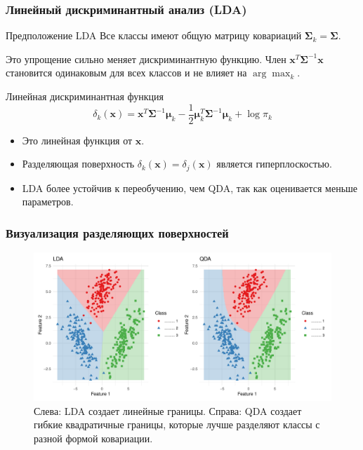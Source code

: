 \documentclass[notheorems, handout]{beamer}
\newcommand{\vect}[1]{\mathbf{#1}}
\newcommand{\matr}[1]{\boldsymbol{#1}}
\begin{document}
\begin{frame}
  \frametitle{Линейный дискриминантный анализ (LDA)}
  \begin{block}{Предположение LDA}
    Все классы имеют общую матрицу ковариаций $\matr{\Sigma}_k = \matr{\Sigma}$.
  \end{block}
  
  Это упрощение сильно меняет дискриминантную функцию. Член $\vect{x}^T\matr{\Sigma}^{-1}\vect{x}$ становится одинаковым для всех классов и не влияет на $\arg\max_k$.
  
  \begin{block}{Линейная дискриминантная функция}
    $$ \delta_k(\vect{x}) = \vect{x}^T\matr{\Sigma}^{-1}\matr{\mu}_k - \frac{1}{2}\matr{\mu}_k^T\matr{\Sigma}^{-1}\matr{\mu}_k + \log\pi_k $$
  \end{block}
  \begin{itemize}
    \item Это линейная функция от $\vect{x}$.
    \item Разделяющая поверхность $\delta_k(\vect{x}) = \delta_j(\vect{x})$ является гиперплоскостью.
    \item LDA более устойчив к переобучению, чем QDA, так как оценивается меньше параметров.
  \end{itemize}
\end{frame}
\begin{frame}
  \frametitle{Визуализация разделяющих поверхностей}
  \begin{figure}
    \includegraphics[width=\textwidth]{img/lda_vs_qda.pdf}
    \caption{Слева: LDA создает линейные границы. Справа: QDA создает гибкие квадратичные границы, которые лучше разделяют классы с разной формой ковариации.}
  \end{figure}
\end{frame}
\end{document}
